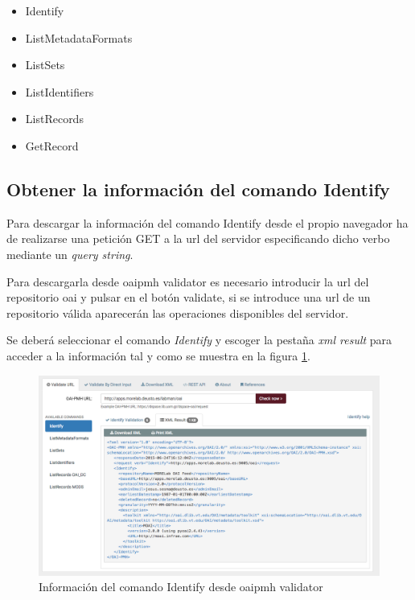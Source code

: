 \begin{itemize}
	\item Identify
	\item ListMetadataFormats
	\item ListSets
	\item ListIdentifiers
	\item ListRecords
	\item GetRecord
\end{itemize}

\subsection{Obtener la información del comando Identify}

Para descargar la información del comando Identify desde el propio navegador ha de realizarse una petición GET a la \acrshort{url} del servidor especificando dicho verbo mediante un \textit{query string}.

Para descargarla desde \acrshort{oaipmh} validator es necesario introducir la \acrshort{url} del repositorio \acrshort{oai} y pulsar en el botón validate, si se introduce una \acrshort{url} de un repositorio válida aparecerán las operaciones disponibles del servidor.

Se deberá seleccionar el comando \textit{Identify} y escoger la pestaña \textit{\acrshort{xml} result} para acceder a la información tal y como se muestra en la figura \ref{fig:download_identify}.

\begin{figure}[!htbp]
	\centering
	\includegraphics[scale=0.31]{fig/download_oai/download_identify}
	\caption{Información del comando Identify desde \acrshort{oaipmh} validator}
	\label{fig:download_identify}
\end{figure}

